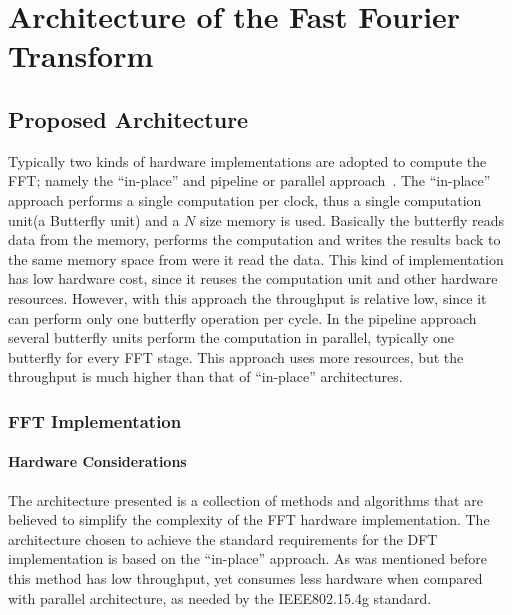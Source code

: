 \chapter{Architecture of the Fast Fourier Transform}

\section{Proposed Architecture}
\label{sec:proposed_fft_architecture}



Typically two kinds of hardware implementations are adopted to compute the FFT; namely the ``in-place'' and pipeline or parallel approach~\cite{chu2000inside}. The ``in-place'' approach performs a single computation per clock, thus a single computation unit(a Butterfly unit) and a $N$ size memory is used. Basically the butterfly reads data from the memory, performs the computation and writes the results back to the same memory space from were it read the data. This kind of implementation has low hardware cost, since it reuses the computation unit and other hardware resources. However, with this approach the throughput is relative low, since it can perform only one butterfly operation per cycle. In the pipeline approach~\cite{mitvlsi} several butterfly units perform the computation in parallel, typically one butterfly for every FFT stage. This approach uses more resources, but the throughput is much higher than that of ``in-place'' architectures. 

\subsection{FFT Implementation}

\subsubsection{Hardware Considerations}

The architecture presented is a collection of methods and algorithms that are believed to simplify the complexity of the FFT hardware implementation. The architecture chosen to achieve the standard requirements for the DFT implementation is based on the ``in-place'' approach. As was mentioned before this method has low throughput, yet consumes less hardware when compared with parallel architecture, as needed by the IEEE802.15.4g standard.

